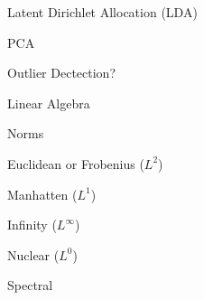 \documentclass[11pt]{article}
\begin{document}
\begin{enumerate}
\begin{item}
\begin{enumerate}
\begin{item}
\begin{enumerate}
                \begin{item}
                  Latent Dirichlet Allocation (LDA)
                \end{item}

                \begin{item}
                  PCA
                \end{item}

                \begin{item}
                  Outlier Dectection?
                \end{item}

            \end{enumerate}

          \end{item}

      \end{enumerate}

    \end{item}

    \begin{item}

      Linear Algebra

      \begin{enumerate}

          \begin{item}

            Norms

            \begin{enumerate}

                \begin{item}
                  Euclidean or Frobenius ($L^2$)
                \end{item}

                \begin{item}
                  Manhatten ($L^1$)
                \end{item}

                \begin{item}
                  Infinity ($L^{\infty}$)
                \end{item}

                \begin{item}
                  Nuclear ($L^0$)
                \end{item}

                \begin{item}
                  Spectral
                \end{item}


\end{enumerate}
\end{item}
\end{enumerate}
\end{item}
\end{enumerate}
\end{document}
